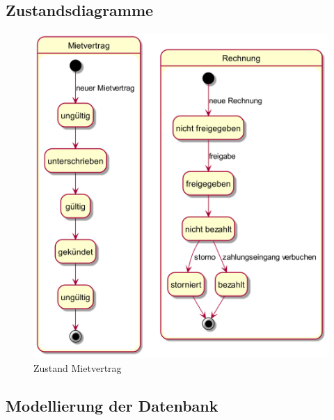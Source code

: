 \subsection{Zustandsdiagramme}
\begin{figure}[H]
  \begin{center}
    \includegraphics[height=0.6\textheight]{content/diagrams/out/zustand/mietvertragRechnung/mietvertragRechnung.png}
    \caption{Zustand Mietvertrag}
    \label{zustMietvertrag}
  \end{center}
\end{figure}

\subsection{Modellierung der Datenbank}

